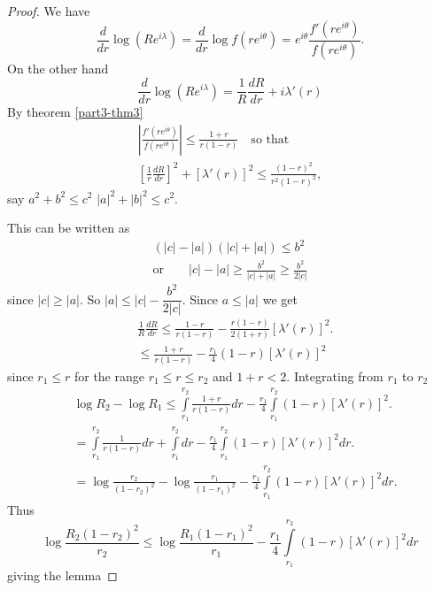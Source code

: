 \begin{proof}
We have
$$
\frac{d}{dr}\log (Re^{i\lambda})=\frac{d}{dr}\log
f(re^{i\theta})=e^{i\theta}\frac{f'(re^{i\theta})}{f(re^{i\theta})}. 
$$
On the other hand
$$
\frac{d}{dr}\log (Re^{i\lambda})=\frac{1}{R}\frac{dR}{dr} + i\lambda'(r)
$$
By theorem \ref{part3-thm3}
\begin{gather*}
\left|\frac{f'(re^{i\theta})}{f(re^{i\theta})}\right|\leq
\frac{1+r}{r(1-r)}\quad\text{so that}\\
\left[\frac{1}{r}\frac{dR}{dr}\right]^{2}+[\lambda'(r)]^{2}\leq
\frac{(1-r)^{2}}{r^{2}(1-r)^{2}}, 
\end{gather*}
say $a^{2}+b^{2}\leq c^{2}$ \ie $|a|^{2}+|b|^{2}\leq c^{2}$.

This can be written as
\begin{align*}
(|c|-|a|)(|c|+|a|)\leq b^{2}\\
\text{or}\qquad |c|-|a|\geq \frac{b^{2}}{|c|+|a|}\geq \frac{b^{2}}{2|c|}
\end{align*}
since $|c|\geq |a|$. So $|a|\leq |c|-\dfrac{b^{2}}{2|c|}$. Since
$a\leq |a|$ we get 
\begin{align*}
& \frac{1}{R}\frac{dR}{dr}\leq
\frac{1-r}{r(1-r)}-\frac{r(1-r)}{2(1+r)}[\lambda'(r)]^{2}.\\
& \leq \frac{1+r}{r(1-r)}-\frac{r_{1}}{4}(1-r)[\lambda'(r)]^{2}
\end{align*}\pageoriginale
since $r_{1}\leq r$ for the range $r_{1}\leq r\leq r_{2}$ and
$1+r<2$. Integrating from $r_{1}$ to $r_{2}$
\begin{align*}
& \log R_{2}-\log R_{1}\leq
\int\limits^{r_{2}}_{r_{1}}\frac{1+r}{r(1-r)}dr-\frac{r_{1}}{4}\int\limits^{r_{2}}_{r_{1}}(1-r)[\lambda'(r)]^{2}.\\
&=
\int\limits^{r_{2}}_{r_{1}}\frac{1}{r(1-r)}dr+\int\limits^{r_{2}}_{r_{1}}dr-\frac{r_{1}}{4}\int\limits^{r_{2}}_{r_{1}}(1-r)[\lambda'(r)]^{2}dr.\\
&= \log \frac{r_{2}}{(1-r_{2})^{2}}-\log \frac{r_{1}}{(1-r_{1})^{2}}-\frac{r_{1}}{4}\int\limits^{r_{2}}_{r_{1}}(1-r)[\lambda'(r)]^{2}dr.
\end{align*}
Thus
$$
\log \frac{R_{2}(1-r_{2})^{2}}{r_{2}}\leq \log\frac{R_{1}(1-r_{1})^{2}}{r_{1}}-\frac{r_{1}}{4}\int\limits^{r_{2}}_{r_{1}}(1-r)[\lambda'(r)]^{2}dr
$$
giving the lemma
\end{proof}

